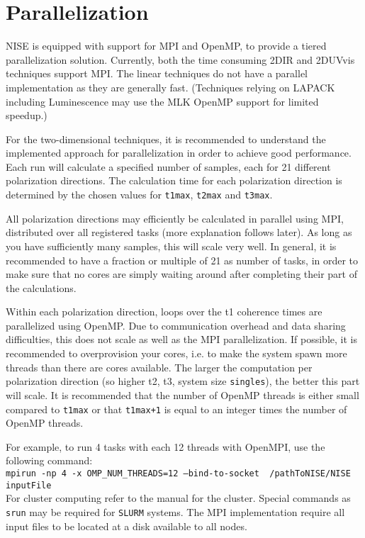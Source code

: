 \documentclass[12pt]{book}
\begin{document}
\section{Parallelization}
NISE is equipped with support for MPI and OpenMP, to provide a tiered parallelization solution. Currently, both the time consuming 2DIR and 2DUVvis techniques support MPI. The linear techniques do not have a parallel implementation as they are generally fast. (Techniques relying on LAPACK including Luminescence may use the MLK OpenMP support for limited speedup.)

For the two-dimensional techniques, it is recommended to understand the implemented approach for parallelization in order to achieve good performance. Each run will calculate a specified number of samples, each for 21 different polarization directions. The calculation time for each polarization direction is determined by the chosen values for {\tt t1max}, {\tt t2max} and {\tt t3max}.

All polarization directions may efficiently be calculated in parallel using MPI, distributed over all registered tasks (more explanation follows later). As long as you have sufficiently many samples, this will scale very well. In general, it is recommended to have a fraction or multiple of 21 as number of tasks, in order to make sure that no cores are simply waiting around after completing their part of the calculations.

Within each polarization direction, loops over the t1 coherence times are parallelized using OpenMP. Due to communication overhead and data sharing difficulties, this does not scale as well as the MPI parallelization. If possible, it is recommended to overprovision your cores, i.e. to make the system spawn more threads than there are cores available. The larger the computation per polarization direction (so higher t2, t3, system size {\tt singles}), the better this part will scale. It is recommended that the number of OpenMP threads is either small compared to {\tt t1max} or that {\tt t1max+1} is equal to an integer times the number of OpenMP threads.

For example, to run 4 tasks with each 12 threads with OpenMPI, use the following command:\\
{\tt mpirun -np 4 -x OMP\_NUM\_THREADS=12 --bind-to-socket ~/pathToNISE/NISE inputFile}\\
For cluster computing refer to the manual for the cluster. Special commands as {\tt srun} may be required for {\tt SLURM} systems. The MPI implementation require all input files to be located at a disk available to all nodes.
\end{document}
